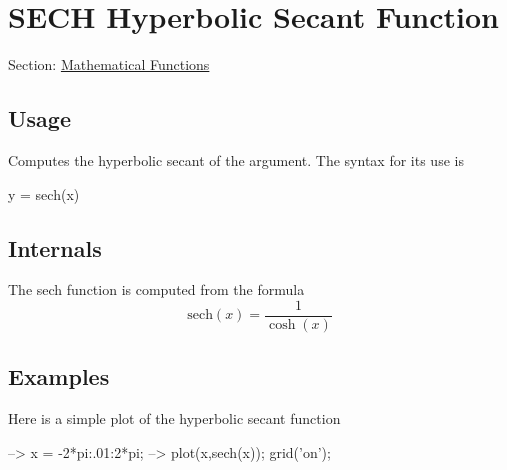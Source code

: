  \hypertarget{mathfunctions_sech}{}\section{S\-E\-C\-H Hyperbolic Secant Function}\label{mathfunctions_sech}
Section\-: \hyperlink{sec_mathfunctions}{Mathematical Functions} \hypertarget{vtkwidgets_vtkxyplotwidget_Usage}{}\subsection{Usage}\label{vtkwidgets_vtkxyplotwidget_Usage}
Computes the hyperbolic secant of the argument. The syntax for its use is \begin{DoxyVerb}   y = sech(x)
\end{DoxyVerb}
 \hypertarget{transforms_svd_Function}{}\subsection{Internals}\label{transforms_svd_Function}
The {\ttfamily sech} function is computed from the formula \[ \mathrm{sech}(x) = \frac{1}{\cosh(x)} \] \hypertarget{variables_matrix_Examples}{}\subsection{Examples}\label{variables_matrix_Examples}
Here is a simple plot of the hyperbolic secant function


\begin{DoxyVerbInclude}
--> x = -2*pi:.01:2*pi;
--> plot(x,sech(x)); grid('on');
\end{DoxyVerbInclude}



